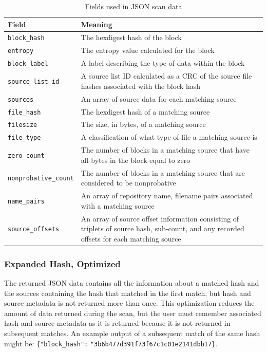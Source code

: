 \documentclass[11pt,fleqn]{article} %
\begin{document}
\begin{table}[!ht]

\centering
\caption{Fields used in JSON scan data}
\label{tab:JSONScanDataExpanded}
\begin{tabular}{|p{5 cm}|p{8.8 cm}|}
\hline \hline
\textbf{Field} & \textbf{Meaning} \\
\hline
\verb+block_hash+ & The hexdigest hash of the block\\
\hline
\verb+entropy+ & The entropy value calculated for the block\\
\hline
\verb+block_label+ & A label describing the type of data within the block\\
\hline
\verb+source_list_id+ & A source list ID calculated as a CRC of the source file hashes associated with the block hash\\
\hline
\verb+sources+ & An array of source data for each matching source\\
\hline
\verb+file_hash+ & The hexdigest hash of a matching source\\
\hline
\verb+filesize+ & The size, in bytes, of a matching source\\
\hline
\verb+file_type+ & A classification of what type of file a matching source is\\
\hline
\verb+zero_count+ & The number of blocks in a matching source that have all bytes in the block equal to zero\\
\hline
\verb+nonprobative_count+ & The number of blocks in a matching source that are considered to be nonprobative\\
\hline
\verb+name_pairs+ & An array of repository name, filename pairs associated with a matching source\\
\hline
\verb+source_offsets+ & An array of source offset information consisting of triplets of source hash, sub-count, and any recorded offsets for each matching source\\
\hline
\end{tabular}
\end{table}

\subsubsection{Expanded Hash, Optimized}
The returned JSON data contains all the information about a matched hash and the sources containing the hash that matched in the first match, but hash and source metadata is not returned more than once. This optimization reduces the amount of data returned during the scan, but the user must remember associated hash and source metadata as it is returned because it is not returned in subsequent matches. An example output of a subsequent match of the same hash might be: \verb+{"block_hash":+ \verb+"3b6b477d391f73f67c1c01e2141dbb17}+.\\
\end{document}
